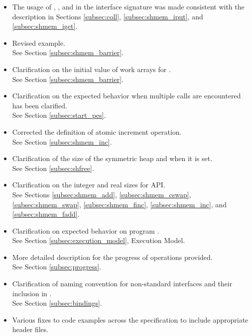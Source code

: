 \begin{itemize}
\item The usage of , , and  in the interface signature 
      was made consistent with the description in Sections \ref{subsec:coll}, \ref{subsec:shmem_iput}, and \ref{subsec:shmem_iget}.
\item Revised example.\\See Section \ref{subsec:shmem_barrier}. 
\item Clarification on the initial value of  work arrays for .\\ See Section \ref{subsec:shmem_barrier}. 
\item Clarification on the expected behavior when multiple  calls are encountered has been clarified.\\See Section \ref{subsec:start_pes}.
\item Corrected the definition of atomic increment operation.\\See Section \ref{subsec:shmem_inc}. 
\item Clarification of the size of the symmetric heap and when it is set.\\See Section \ref{subsec:shfree}.
\item Clarification on the integer and real sizes for \Fortran{} \ac{API}.\\See Sections \ref{subsec:shmem_add}, \ref{subsec:shmem_cswap}, \ref{subsec:shmem_swap}, \ref{subsec:shmem_finc}, \ref{subsec:shmem_inc}, and \ref{subsec:shmem_fadd}. 
\item Clarification on expected behavior on program .\\ See Section \ref{subsec:execution_model}, Execution Model. 
\item More detailed description for the progress of \openshmem operations provided.\\ See Section \ref{subsec:progress}. 
\item Clarification of naming convention for non-standard interfaces and their inclusion in .\\ See Section \ref{subsec:bindings}. 
\item Various fixes to \openshmem code examples across the specification to include appropriate header files. 

\end{itemize}
